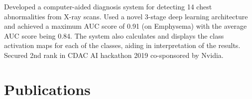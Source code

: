 \documentclass[]{deedy-resume-openfont}
\begin{document}
\begin{minipage}[t]{0.7\textwidth}
Developed a computer-aided diagnosis system for detecting 14 chest abnormalities from X-ray scans. Used a novel 3-stage deep learning architecture and achieved a maximum AUC score of 0.91 (on Emphysema) with the average AUC score being 0.84. The system also calculates and displays the class activation maps for each of the classes, aiding in interpretation of the results. Secured 2nd rank in CDAC AI hackathon 2019 co-sponsored by Nvidia.
\sectionsep

\sectionsep


\sectionsep


\section{Publications} 
\renewcommand\refname{\vskip -1.5em} %


\nocite{*}

\end{minipage} 
\end{document}
